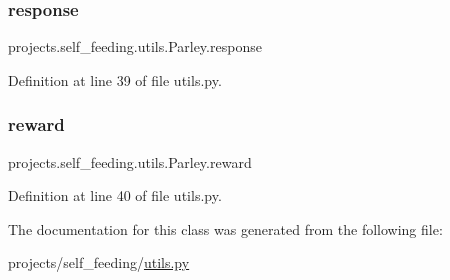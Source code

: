 \subsubsection{\texorpdfstring{response}{response}}
{\footnotesize\ttfamily projects.\+self\+\_\+feeding.\+utils.\+Parley.\+response}



Definition at line 39 of file utils.\+py.

\mbox{\label{classprojects_1_1self__feeding_1_1utils_1_1Parley_a19499f2c53886bc11c811a17acca012d}} 
\subsubsection{\texorpdfstring{reward}{reward}}
{\footnotesize\ttfamily projects.\+self\+\_\+feeding.\+utils.\+Parley.\+reward}



Definition at line 40 of file utils.\+py.



The documentation for this class was generated from the following file\+:\begin{DoxyCompactItemize}
\item 
projects/self\+\_\+feeding/\hyperlink{projects_2self__feeding_2utils_8py}{utils.\+py}\end{DoxyCompactItemize}
